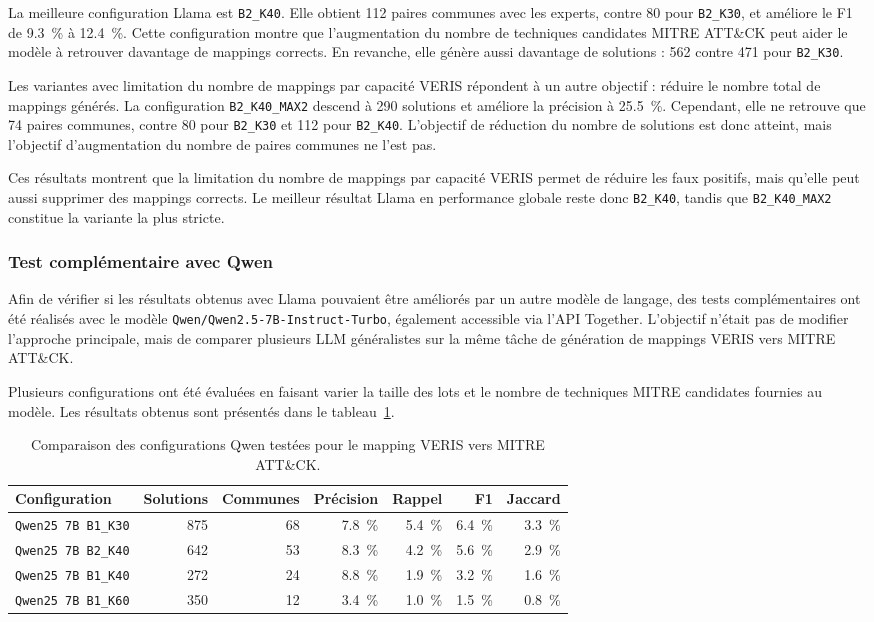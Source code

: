 \documentclass[a4paper,12pt]{article}
\begin{document}
La meilleure configuration Llama est \texttt{B2\_K40}. Elle obtient 112 paires communes avec les experts, contre 80 pour \texttt{B2\_K30}, et améliore le F1 de 9.3~\% à 12.4~\%. Cette configuration montre que l'augmentation du nombre de techniques candidates MITRE ATT\&CK peut aider le modèle à retrouver davantage de mappings corrects. En revanche, elle génère aussi davantage de solutions : 562 contre 471 pour \texttt{B2\_K30}.

Les variantes avec limitation du nombre de mappings par capacité VERIS répondent à un autre objectif : réduire le nombre total de mappings générés. La configuration \texttt{B2\_K40\_MAX2} descend à 290 solutions et améliore la précision à 25.5~\%. Cependant, elle ne retrouve que 74 paires communes, contre 80 pour \texttt{B2\_K30} et 112 pour \texttt{B2\_K40}. L'objectif de réduction du nombre de solutions est donc atteint, mais l'objectif d'augmentation du nombre de paires communes ne l'est pas.

Ces résultats montrent que la limitation du nombre de mappings par capacité VERIS permet de réduire les faux positifs, mais qu'elle peut aussi supprimer des mappings corrects. Le meilleur résultat Llama en performance globale reste donc \texttt{B2\_K40}, tandis que \texttt{B2\_K40\_MAX2} constitue la variante la plus stricte.

\subsubsection{Test complémentaire avec Qwen}

Afin de vérifier si les résultats obtenus avec Llama pouvaient être améliorés par un autre modèle de langage, des tests complémentaires ont été réalisés avec le modèle \texttt{Qwen/Qwen2.5-7B-Instruct-Turbo}, également accessible via l'API Together. L'objectif n'était pas de modifier l'approche principale, mais de comparer plusieurs LLM généralistes sur la même tâche de génération de mappings VERIS vers MITRE ATT\&CK.

Plusieurs configurations ont été évaluées en faisant varier la taille des lots et le nombre de techniques MITRE candidates fournies au modèle. Les résultats obtenus sont présentés dans le tableau~\ref{tab:qwen-results}.

\begin{table}[H]
\centering
\small
\begin{tabular}{lrrrrrr}
\toprule
Configuration & Solutions & Communes & Précision & Rappel & F1 & Jaccard \\
\midrule
\texttt{Qwen25 7B B1\_K30} & 875 & 68 & 7.8~\% & 5.4~\% & 6.4~\% & 3.3~\% \\
\texttt{Qwen25 7B B2\_K40} & 642 & 53 & 8.3~\% & 4.2~\% & 5.6~\% & 2.9~\% \\
\texttt{Qwen25 7B B1\_K40} & 272 & 24 & 8.8~\% & 1.9~\% & 3.2~\% & 1.6~\% \\
\texttt{Qwen25 7B B1\_K60} & 350 & 12 & 3.4~\% & 1.0~\% & 1.5~\% & 0.8~\% \\
\bottomrule
\end{tabular}
\caption{Comparaison des configurations Qwen testées pour le mapping VERIS vers MITRE ATT\&CK.}
\label{tab:qwen-results}
\end{table}
\end{document}
